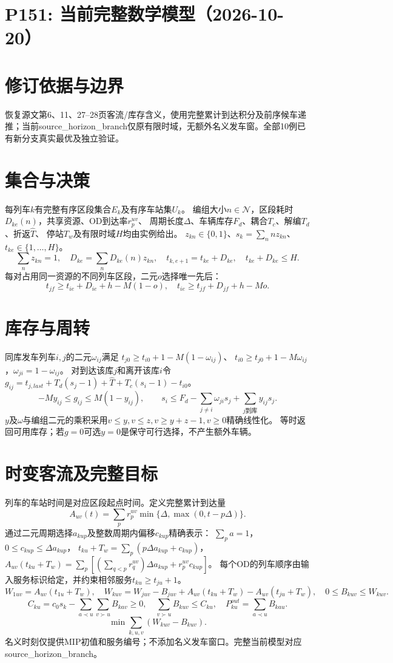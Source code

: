 \documentclass[11pt]{ctexart}
\begin{document}
\section*{P151: 当前完整数学模型（2026-10-20）}
\section*{修订依据与边界}恢复源文第6、11、27–28页客流/库存含义，使用完整累计到达积分及前序候车递推；当前source_horizon_branch仅原有限时域，无额外名义发车窗。全部10例已有新分支真实最优及独立验证。

\section*{集合与决策}
每列车$k$有完整有序区段集合$E_k$及有序车站集$U_k$。
编组大小$n\in\mathcal N$，区段耗时$D_{ke}(n)$，共享资源、OD到达率$r^{uv}_p$、
周期长度$\Delta$、车辆库存$F_d$、耦合$T_c$、解编$T_d$、折返$\hat T$、
停站$T_w$及有限时域$H$均由实例给出。
$z_{kn}\in\{0,1\}$、$s_k=\sum_nn z_{kn}$、$t_{ke}\in\{1,\ldots,H\}$。
\[
\sum_nz_{kn}=1,\quad D_{ke}=\sum_nD_{ke}(n)z_{kn},\quad
t_{k,e+1}=t_{ke}+D_{ke},\quad t_{ke}+D_{ke}\le H.
\]
每对占用同一资源的不同列车区段，二元$o$选择唯一先后：
\[
t_{jf}\ge t_{ie}+D_{ie}+h-M(1-o),\quad
t_{ie}\ge t_{jf}+D_{jf}+h-Mo.
\]
\section*{库存与周转}
同库发车列车$i,j$的二元$\omega_{ij}$满足
$t_{j0}\ge t_{i0}+1-M(1-\omega_{ij})$、
$t_{i0}\ge t_{j0}+1-M\omega_{ij}$，$\omega_{ji}=1-\omega_{ij}$。
对到达该库$j$和离开该库$i$令
$g_{ij}=t_{j,last}+T_d(s_j-1)+\hat T+T_c(s_i-1)-t_{i0}$。
\[
-My_{ij}\le g_{ij}\le M(1-y_{ij}),\qquad
s_i\le F_d-\sum_{j\ne i}\omega_{ji}s_j+\sum_{j\text{到库}}y_{ij}s_j.
\]
$y$及$\omega$与编组二元的乘积采用$v\le y,v\le z,v\ge y+z-1,v\ge0$精确线性化。
等时返回可用库存；若$g=0$可选$y=0$是保守可行选择，不产生额外车辆。
\section*{时变客流及完整目标}
列车的车站时间是对应区段起点时间。定义完整累计到达量
\[
A_{uv}(t)=\sum_p r^{uv}_p\min\{\Delta,\max(0,t-p\Delta)\}.
\]
通过二元周期选择$a_{kup}$及整数周期内偏移$c_{kup}$精确表示：
$\sum_pa=1$，$0\le c_{kup}\le\Delta a_{kup}$，
$t_{ku}+T_w=\sum_p(p\Delta a_{kup}+c_{kup})$，
$A_{uv}(t_{ku}+T_w)=\sum_p[(\sum_{q<p}r_q^{uv})\Delta a_{kup}+r_p^{uv}c_{kup}]$。
每个OD的列车顺序由输入服务标识给定，并约束相邻服务$t_{ku}\ge t_{ju}+1$。
\[
W_{1uv}=A_{uv}(t_{1u}+T_w),\quad
W_{kuv}=W_{juv}-B_{juv}+A_{uv}(t_{ku}+T_w)-A_{uv}(t_{ju}+T_w),
\quad0\le B_{kuv}\le W_{kuv}.
\]
\[
C_{ku}=c_0s_k-\sum_{a\prec u}\sum_{v\succ u}B_{kav}\ge0,\quad
\sum_{v\succ u}B_{kuv}\le C_{ku},\quad
P^{out}_{ku}=\sum_{a\prec u}B_{kau}.
\]
\[
\min\sum_{k,u,v}(W_{kuv}-B_{kuv}).
\]
名义时刻仅提供MIP初值和服务编号；不添加名义发车窗口。完整当前模型对应source\_horizon\_branch。
\end{document}
